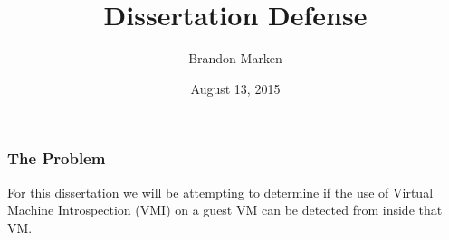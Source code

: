 \documentclass{beamer}
\title{Dissertation Defense}
\author{Brandon Marken}
\date{August 13, 2015}
\begin{document}
\maketitle

\begin{frame}
\frametitle{The Problem}
For this dissertation we will be attempting to determine if the use of Virtual Machine Introspection (VMI) on a guest VM can be detected from inside that VM. 
\end{frame}


\begin{frame}
\end{frame}



%

\end{document}
